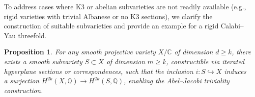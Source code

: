 \documentclass[11pt]{article}
\newtheorem{proposition}[theorem]{Proposition}
\begin{document}
To address cases where K3 or abelian subvarieties are not readily available (e.g., rigid varieties with trivial Albanese or no K3 sections), we clarify the construction of suitable subvarieties and provide an example for a rigid Calabi–Yau threefold.

\begin{proposition}\label{prop:subvariety-availability}
For any smooth projective variety \( X/\mathbb{C} \) of dimension \( d \geq k \), there exists a smooth subvariety \( S \subset X \) of dimension \( m \geq k \), constructible via iterated hyperplane sections or correspondences, such that the inclusion \( i: S \hookrightarrow X \) induces a surjection \( H^{2k}(X, \mathbb{Q}) \to H^{2k}(S, \mathbb{Q}) \), enabling the Abel–Jacobi triviality construction.
\end{proposition}
\end{document}
